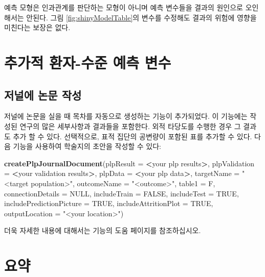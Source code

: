 \documentclass[11pt]{book}
\newenvironment{Shaded}{\begin{snugshade}}{\end{snugshade}}
\newcommand{\KeywordTok}[1]{\textcolor[rgb]{0.13,0.29,0.53}{\textbf{#1}}}
\newcommand{\DataTypeTok}[1]{\textcolor[rgb]{0.13,0.29,0.53}{#1}}
\newcommand{\StringTok}[1]{\textcolor[rgb]{0.31,0.60,0.02}{#1}}
\newcommand{\OtherTok}[1]{\textcolor[rgb]{0.56,0.35,0.01}{#1}}
\newcommand{\OperatorTok}[1]{\textcolor[rgb]{0.81,0.36,0.00}{\textbf{#1}}}
\newcommand{\NormalTok}[1]{#1}
\theoremstyle{definition}
\theoremstyle{definition}
\theoremstyle{definition}
\theoremstyle{remark}
\let\BeginKnitrBlock\begin \let\EndKnitrBlock\end
\begin{document}
\BeginKnitrBlock{rmdimportant}
예측 모형은 인과관계를 판단하는 모형이 아니며 예측 변수들을 결과의
원인으로 오인해서는 안된다. 그림 \ref{fig:shinyModelTable}의 변수를
수정해도 결과의 위험에 영향을 미친다는 보장은 없다.
\EndKnitrBlock{rmdimportant}

\section{추가적 환자-수준 예측 변수}\label{----}

\subsection{저널에 논문 작성}\label{--}

저널에 논문을 실을 때 목차를 자동으로 생성하는 기능이 추가되었다. 이
기능에는 작성된 연구의 많은 세부사항과 결과들을 포함한다. 외적 타당도를
수행한 경우 그 결과도 추가 할 수 있다. 선택적으로, 표적 집단의 공변량이
포함된 표를 추가할 수 있다. 다음 기능을 사용하여 학술지의 초안을 작성할
수 있다:

\begin{Shaded}
\begin{Highlighting}[]
 \KeywordTok{createPlpJournalDocument}\NormalTok{(}\DataTypeTok{plpResult =} \OperatorTok{<}\NormalTok{your plp results}\OperatorTok{>}\NormalTok{,}
             \DataTypeTok{plpValidation =} \OperatorTok{<}\NormalTok{your validation results}\OperatorTok{>}\NormalTok{,}
             \DataTypeTok{plpData =} \OperatorTok{<}\NormalTok{your plp data}\OperatorTok{>}\NormalTok{,}
             \DataTypeTok{targetName =} \StringTok{"<target population>"}\NormalTok{,}
             \DataTypeTok{outcomeName =} \StringTok{"<outcome>"}\NormalTok{,}
             \DataTypeTok{table1 =}\NormalTok{ F,}
             \DataTypeTok{connectionDetails =} \OtherTok{NULL}\NormalTok{,}
             \DataTypeTok{includeTrain =} \OtherTok{FALSE}\NormalTok{,}
             \DataTypeTok{includeTest =} \OtherTok{TRUE}\NormalTok{,}
             \DataTypeTok{includePredictionPicture =} \OtherTok{TRUE}\NormalTok{,}
             \DataTypeTok{includeAttritionPlot =} \OtherTok{TRUE}\NormalTok{,}
             \DataTypeTok{outputLocation =} \StringTok{"<your location>"}\NormalTok{)}
\end{Highlighting}
\end{Shaded}

더욱 자세한 내용에 대해서는 기능의 도움 페이지를 참조하십시오.

\section{요약}\label{-11}
\end{document}

